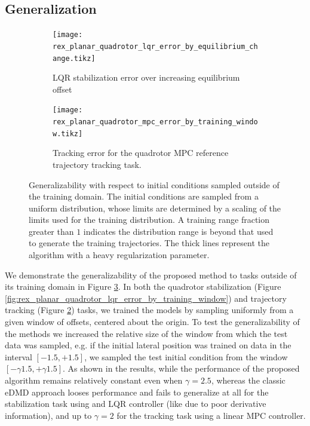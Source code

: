 \documentclass{article}
\begin{document}
\subsection{Generalization}
\begin{figure}[t] \centering
  \begin{subfigure}[t]{0.49\textwidth}
    \centering
    \texttt{[image: rex\_planar\_quadrotor\_lqr\_error\_by\_equilibrium\_change.tikz]}
    \caption{LQR stabilization error over increasing equilibrium offset}
    \label{fig:rex_planar_quadrotor_lqr_error_by_equilibrium_change}
  \end{subfigure}
  \hfill
  \begin{subfigure}[t]{0.48\textwidth}
    \raggedright
    \texttt{[image: rex\_planar\_quadrotor\_mpc\_error\_by\_training\_window.tikz]}
    \caption{Tracking error for the quadrotor MPC reference trajectory tracking task.}
    \label{fig:rex_planar_quadrotor_mpc_error_by_training_window}
  \end{subfigure}
  \caption{Generalizability with respect to initial conditions sampled outside of the 
  training domain. The initial conditions are sampled from a uniform distribution, whose 
  limits are determined by a scaling of the limits used for the training distribution. 
  A training range fraction greater than $1$ indicates the
  distribution range is beyond that used to generate the training trajectories. The thick 
  lines represent the algorithm with a heavy regularization parameter.
  }
  \label{fig:training_window}
\end{figure}


We demonstrate the generalizability of the proposed method to tasks outside of its training
domain in Figure \ref{fig:training_window}. In both the quadrotor 
stabilization (Figure \ref{fig:rex_planar_quadrotor_lqr_error_by_training_window}) and 
trajectory tracking (Figure \ref{fig:rex_planar_quadrotor_mpc_error_by_training_window})
tasks, we trained the models by sampling uniformly from a given window of offsets, centered 
about the origin. 
To test the generalizability of the methods we increased the relative size of the window 
from which the test data was sampled, e.g. if the initial lateral position was trained on 
data in the interval $[-1.5,+1.5]$, we sampled the test initial condition from the window 
$[-\gamma 1.5, +\gamma 1.5]$. As shown in the results, while the performance of the proposed
algorithm remains relatively constant even when $\gamma = 2.5$, whereas the classic eDMD 
approach looses performance and fails to generalize at all for the stabilization task using 
and LQR controller (like due to poor derivative information), and up to $\gamma = 2$ for the 
tracking task using a linear MPC controller.
\end{document}
